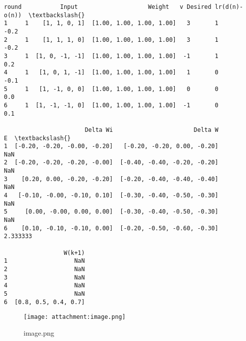 \documentclass[11pt]{article}
\makeatletter
\newcommand{\boxspacing}{\kern\kvtcb@left@rule\kern\kvtcb@boxsep}
\newcommand{\prompt}[4]{
        {\ttfamily\llap{{\color{#2}[#3]:\hspace{3pt}#4}}\vspace{-\baselineskip}}
    }
\makeatother
\begin{document}
            \begin{tcolorbox}[breakable, size=fbox, boxrule=.5pt, pad at break*=1mm, opacityfill=0]
\prompt{Out}{outcolor}{93}{\boxspacing}
\begin{Verbatim}[commandchars=\\\{\}]
  round           Input                    Weight   v Desired lr(d(n)-o(n))  \textbackslash{}
1     1    [1, 1, 0, 1]  [1.00, 1.00, 1.00, 1.00]   3       1          -0.2
2     1    [1, 1, 1, 0]  [1.00, 1.00, 1.00, 1.00]   3       1          -0.2
3     1  [1, 0, -1, -1]  [1.00, 1.00, 1.00, 1.00]  -1       1           0.2
4     1   [1, 0, 1, -1]  [1.00, 1.00, 1.00, 1.00]   1       0          -0.1
5     1   [1, -1, 0, 0]  [1.00, 1.00, 1.00, 1.00]   0       0           0.0
6     1  [1, -1, -1, 0]  [1.00, 1.00, 1.00, 1.00]  -1       0           0.1

                       Delta Wi                       Delta W         E  \textbackslash{}
1  [-0.20, -0.20, -0.00, -0.20]   [-0.20, -0.20, 0.00, -0.20]       NaN
2  [-0.20, -0.20, -0.20, -0.00]  [-0.40, -0.40, -0.20, -0.20]       NaN
3    [0.20, 0.00, -0.20, -0.20]  [-0.20, -0.40, -0.40, -0.40]       NaN
4   [-0.10, -0.00, -0.10, 0.10]  [-0.30, -0.40, -0.50, -0.30]       NaN
5     [0.00, -0.00, 0.00, 0.00]  [-0.30, -0.40, -0.50, -0.30]       NaN
6    [0.10, -0.10, -0.10, 0.00]  [-0.20, -0.50, -0.60, -0.30]  2.333333

                 W(k+1)
1                   NaN
2                   NaN
3                   NaN
4                   NaN
5                   NaN
6  [0.8, 0.5, 0.4, 0.7]
\end{Verbatim}
\end{tcolorbox}
        
    \begin{figure}
\centering
\texttt{[image: attachment:image.png]}
\caption{image.png}
\end{figure}
\end{document}
